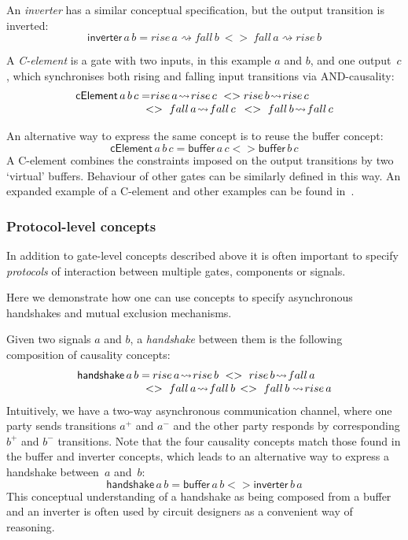 \documentclass[british,conference,compsoc]{IEEEtran}
\begin{document}
\noindent An \emph{inverter} has a similar conceptual specification, but the
output transition is inverted:
\[
\mathsf{inverter}\,a\,b=rise\,a\rightsquigarrow fall\,b\ <>\
fall\,a\rightsquigarrow rise\,b
\]

\noindent A \emph{C-element} is a gate with two inputs, in this example $a$ and $b$, and one
output~$c$, which synchronises both rising and falling input transitions
via AND-causality:
\[
\begin{array}{lcl}
\mathsf{cElement}\,a\, b\, c=&\hspace{-10mm}rise\,a\!\rightsquigarrow\! rise\,c\ <> rise\,b\!\rightsquigarrow\! rise\,c\ \\
&\hspace{-5mm}<>\ fall\,a\!\rightsquigarrow\! fall\,c\ \,<>\ fall\,b\!\rightsquigarrow\! fall\,c
\end{array}
\]

An alternative way to express the same concept is to reuse the buffer concept:
\[
\mathsf{cElement}\,a\, b\, c=\mathsf{buffer}\,a\, c <> \mathsf{buffer}\,b\, c
\]
A C-element combines the constraints imposed on the output
transitions by two `virtual' buffers. Behaviour of other gates can be similarly defined in this way.
An expanded example of a C-element and other examples can be found in~\cite{2015_Beaumont_MEMOCODE}.

\subsubsection{Protocol-level concepts} In addition to gate-level concepts
described above it is often important to specify \emph{protocols}
of interaction between multiple gates, components or signals. 

Here we demonstrate how one can use concepts to specify asynchronous handshakes
and mutual exclusion mechanisms.

Given two signals $a$ and $b$, a \emph{handshake} between them is
the following composition of causality concepts:
\[
\begin{array}{lcl}
\mathsf{handshake}\,a\, b=&\hspace{-8mm}rise\,a\!\rightsquigarrow\! rise\,b\ <>\ rise\,b\!\rightsquigarrow\! fall\,a \\
&\hspace{-5mm}<>\ fall\,a\!\rightsquigarrow\! fall\,b \, <>\ fall\,b \rightsquigarrow\! rise\,a
\end{array}
\]
Intuitively, we have a two-way asynchronous communication channel,
where one party sends transitions $a^{+}$ and $a^{-}$ and the other
party responds by corresponding $b^{+}$ and $b^{-}$ transitions.
Note that the four causality concepts match those found
in the buffer and inverter concepts, which leads to an alternative
way to express a handshake between~$a$ and~$b$:
\[
\mathsf{handshake}\,a\, b=\mathsf{buffer}\,a\, b <>\mathsf{inverter}\,b\, a
\]
This conceptual understanding of a handshake as being composed
from a buffer and an inverter is often used by circuit designers as
a convenient way of reasoning.
\end{document}
